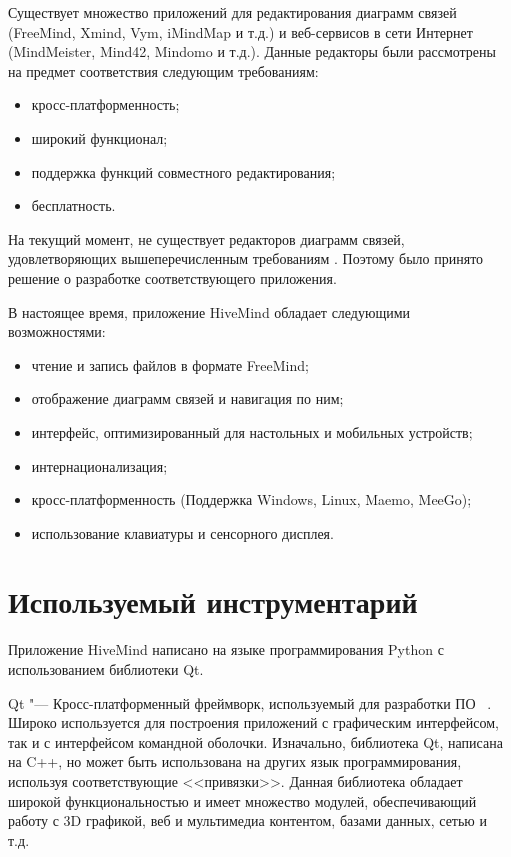 Существует множество приложений для редактирования диаграмм связей (FreeMind,
Xmind, Vym, iMindMap и т.д.) и веб-сервисов в сети Интернет (MindMeister,
Mind42, Mindomo и т.д.). Данные редакторы были рассмотрены на предмет
соответствия следующим требованиям:
\begin{itemize}
\item кросс-платформенность;
\item широкий функционал;
\item поддержка функций совместного редактирования;
\item бесплатность.
\end{itemize}
На текущий момент, не существует редакторов диаграмм связей, удовлетворяющих
вышеперечисленным требованиям \cite{hivemind-8th-fruct}. Поэтому было принято
решение о разработке соответствующего приложения.

В настоящее время, приложение HiveMind обладает следующими возможностями:
\begin{itemize}
\item чтение и запись файлов в формате FreeMind;
\item отображение диаграмм связей и навигация по ним;
\item интерфейс, оптимизированный для настольных и мобильных устройств;
\item интернационализация;
\item кросс-платформенность (Поддержка Windows, Linux, Maemo, MeeGo);
\item использование клавиатуры и сенсорного дисплея.
\end{itemize}


\section{Используемый инструментарий}
\label{sec:toolkit}
Приложение HiveMind написано на языке программирования Python с использованием
библиотеки Qt.

Qt "--- Кросс-платформенный фреймворк, используемый для разработки ПО
~\cite{qt4}. Широко используется для построения приложений с графическим
интерфейсом, так и с интерфейсом командной оболочки. Изначально, библиотека Qt,
написана на C++, но может быть использована на других язык программирования,
используя соответствующие <<привязки>>. Данная библиотека обладает широкой
функциональностью и имеет множество модулей, обеспечивающий работу с 3D
графикой, веб и мультимедиа контентом, базами данных, сетью и т.д.

